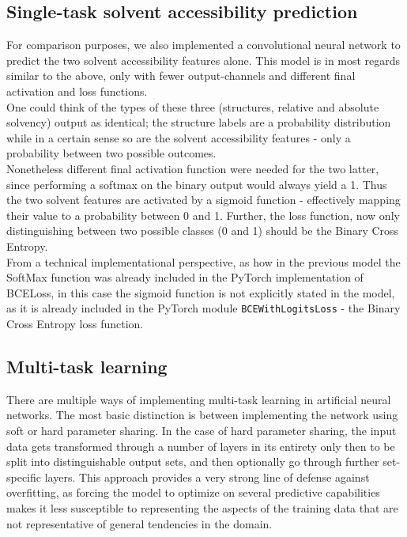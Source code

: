 \begin{multicols}{2}
\subsection{Single-task solvent accessibility prediction}
For comparison purposes, we also implemented a convolutional neural network to predict the two solvent accessibility features alone. This model is in most regards similar to the above, only with fewer output-channels and different final activation and loss functions.\\
One could think of the types of these three (structures, relative and absolute solvency) output as identical; the structure labels are a probability distribution while in a certain sense so are the solvent accessibility features - only a probability between two possible outcomes.\\
Nonetheless different final activation function were needed for the two latter, since performing a softmax on the binary output would always yield a 1. Thus the two solvent features are activated by a sigmoid function - effectively mapping their value to a probability between 0 and 1. Further, the loss function, now only distinguishing between two possible classes (0 and 1) should be the Binary Cross Entropy.\\
From a technical implementational perspective, as how in the previous model the SoftMax function was already included in the PyTorch implementation of BCELoss, in this case the sigmoid function is not explicitly stated in the model, as it is already included in the PyTorch module \texttt{BCEWithLogitsLoss} - the Binary Cross Entropy loss function.

\subsection{Multi-task learning}
There are multiple ways of implementing multi-task learning in artificial neural networks. The most basic distinction is between implementing the network using soft or hard parameter sharing. In the case of hard parameter sharing, the input data gets transformed through a number of layers in its entirety only then to be split into distinguishable output sets, and then optionally go through further set-specific layers. This approach provides a very strong line of defense against overfitting, as forcing the model to optimize on several predictive capabilities makes it less  susceptible to representing the aspects of the training data that are not representative of general tendencies in the domain. 


\end{multicols}
